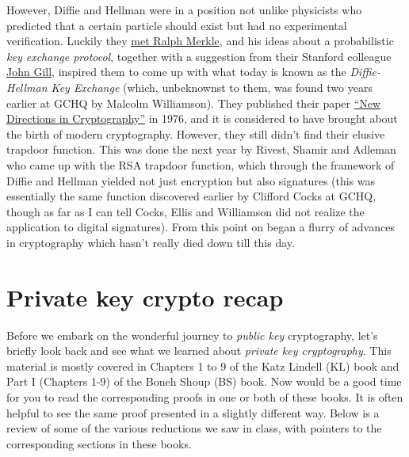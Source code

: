 However, Diffie and Hellman were in a position not unlike physicists who
predicted that a certain particle should exist but had no experimental
verification. Luckily they
\href{http://cr.yp.to/bib/1988/diffie.pdf}{met Ralph Merkle}, and his
ideas about a probabilistic \emph{key exchange protocol}, together with
a suggestion from their Stanford colleague
\href{https://profiles.stanford.edu/john-gill}{John Gill}, inspired them
to come up with what today is known as the \emph{Diffie-Hellman Key
Exchange} (which, unbeknownst to them, was found two years earlier at
GCHQ by Malcolm Williamson). They published their paper
\href{https://www-ee.stanford.edu/~hellman/publications/24.pdf}{``New
Directions in Cryptography''} in 1976, and it is considered to have
brought about the birth of modern cryptography. However, they still
didn't find their elusive trapdoor function. This was done the next year
by Rivest, Shamir and Adleman who came up with the RSA trapdoor
function, which through the framework of Diffie and Hellman yielded not
just encryption but also signatures (this was essentially the same
function discovered earlier by Clifford Cocks at GCHQ, though as far as
I can tell Cocks, Ellis and Williamson did not realize the application
to digital signatures). From this point on began a flurry of advances in
cryptography which hasn't really died down till this day.

\section{Private key crypto recap}\label{Private-key-crypto-recap}

Before we embark on the wonderful journey to \emph{public key}
cryptography, let's briefly look back and see what we learned about
\emph{private key cryptography}. This material is mostly covered in
Chapters 1 to 9 of the Katz Lindell (KL) book and Part I (Chapters 1-9)
of the Boneh Shoup (BS) book. Now would be a good time for you to read
the corresponding proofs in one or both of these books. It is often
helpful to see the same proof presented in a slightly different way.
Below is a review of some of the various reductions we saw in class,
with pointers to the corresponding sections in these books.

